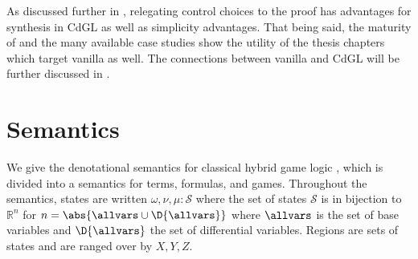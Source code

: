 \documentclass[12pt]{cmuthesis}
\theoremstyle{definition}
\theoremstyle{remark}
\newcommand{\rref}[2][]{\prettyref{#2}}
\newcommand{\allstate}{\mathcal{S}}
\newcommand{\CdGL}{\textsf{CdGL}\xspace}
\begin{document}
As discussed further in \rref{ch:cdgl}, relegating control choices to the proof has advantages for synthesis in \CdGL as well as simplicity advantages.
That being said, the maturity of \KeYmaeraX and the many available case studies show the utility of the thesis chapters which target vanilla \dL as well.
The connections between vanilla \dL and \CdGL will be further discussed in \rref{ch:cdgl}.

\section{Semantics}
\label{sec:dgl-semantics}
We give the denotational semantics for classical hybrid game logic \dGL, which is divided into a semantics for terms, formulas, and games.
Throughout the semantics, states are written $\omega, \nu, \mu : \allstate$ where the set of states $\allstate$ is in bijection to $\mathbb{R}^n$ for $n = \abs{\allvars \cup \D{\allvars}}$ where $\allvars$ is the set of base variables and $\D{\allvars}$ the set of differential variables.
Regions are sets of states and are ranged over by $X, Y, Z$.
\end{document}
